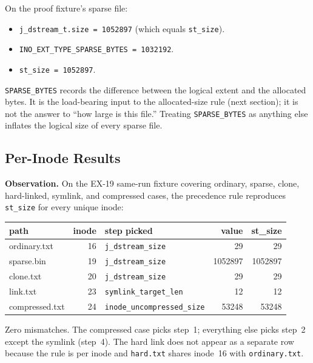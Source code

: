 On the proof fixture's sparse file:

\begin{itemize}
  \item \texttt{j\_dstream\_t.size = 1052897} (which equals
    \texttt{st\_size}).
  \item \texttt{INO\_EXT\_TYPE\_SPARSE\_BYTES = 1032192}.
  \item \texttt{st\_size = 1052897}.
\end{itemize}

\texttt{SPARSE\_BYTES} records the difference between the logical
extent and the allocated bytes. It is the load-bearing input to the
allocated-size rule (next section); it is not the answer to ``how
large is this file.'' Treating \texttt{SPARSE\_BYTES} as anything
else inflates the logical size of every sparse file.

\subsection{Per-Inode Results}

\textbf{Observation.} On the EX-19 same-run fixture covering ordinary,
sparse, clone, hard-linked, symlink, and compressed cases, the
precedence rule reproduces \texttt{st\_size} for every unique inode:

\begin{center}
\begin{tabular}{lrlrr}
\toprule
path & inode & step picked & value & st\_size \\
\midrule
ordinary.txt   & 16 & \texttt{j\_dstream\_size}         & 29      & 29 \\
sparse.bin     & 19 & \texttt{j\_dstream\_size}         & 1052897 & 1052897 \\
clone.txt      & 20 & \texttt{j\_dstream\_size}         & 29      & 29 \\
link.txt       & 23 & \texttt{symlink\_target\_len}     & 12      & 12 \\
compressed.txt & 24 & \texttt{inode\_uncompressed\_size} & 53248   & 53248 \\
\bottomrule
\end{tabular}
\end{center}

Zero mismatches. The compressed case picks step~1; everything else
picks step~2 except the symlink (step~4). The hard link does not
appear as a separate row because the rule is per inode and
\texttt{hard.txt} shares inode~16 with \texttt{ordinary.txt}.

